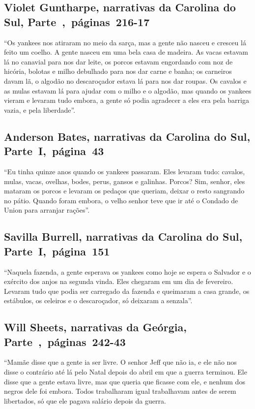 \subsection{Violet Guntharpe, narrativas da Carolina do Sul, Parte~,~páginas~216-17}

``Os yankees nos atiraram no meio da sarça, mas a gente não nasceu e
cresceu lá feito um coelho. A gente nasceu em uma bela casa de madeira.
As vacas estavam lá no canavial para nos dar leite, os porcos estavam
engordando com noz de hicória, bolotas e milho debulhado para nos dar
carne e banha; os carneiros davam lã, o algodão no descaroçador estava
lá para nos dar roupas. Os cavalos e as mulas estavam lá para ajudar com
o milho e o algodão, mas quando os yankees vieram e levaram tudo embora,
a gente só podia agradecer a eles era pela barriga vazia, e pela
liberdade''.

\subsection{Anderson Bates, narrativas da Carolina do Sul, Parte~I,~página~43} \label{ref20}

``Eu tinha quinze anos quando os yankees passaram. Eles levaram tudo:
cavalos, mulas, vacas, ovelhas, bodes, perus, gansos e galinhas. Porcos?
Sim, senhor, eles mataram os porcos e levaram os pedaços que queriam,
deixar o resto sangrando no pátio. Quando foram embora, o velho senhor %
teve que ir até o Condado de Union para arranjar rações''.

\subsection{Savilla Burrell, narrativas da Carolina do Sul, Parte~I,~página~151} \label{ref40}

``Naquela fazenda, a gente esperava os yankees como hoje se espera o
Salvador e o exército dos anjos na segunda vinda. Eles chegaram em um
dia de fevereiro. Levaram tudo que podia ser carregado da fazenda e
queimaram a casa grande, os estábulos, os celeiros e o descaroçador, só
deixaram a senzala''.

\subsection{Will Sheets, narrativas da Geórgia, Parte~,~páginas~242-43}
\label{ref238}

``Mamãe disse que a gente ia ser livre. O senhor Jeff que não ia, e ele
não nos disse o contrário até lá pelo Natal depois do abril em que a
guerra terminou. Ele disse que a gente estava livre, mas que queria que
ficasse com ele, e nenhum dos negros dele foi embora. Todos trabalharam
igual trabalhavam antes de serem libertados, só que ele pagava salário
depois da guerra.

